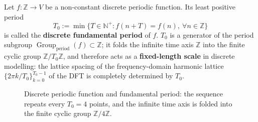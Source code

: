 \begin{definition}\label{def:discrete_fundamental_period}
Let $f:\mathbb{Z}\to V$ be a non-constant discrete periodic function. Its least positive period
\[
T_0:=\min\{T\in\mathbb{N}^+:f(n+T)=f(n),\ \forall n\in\mathbb{Z}\}
\]
is called the \textbf{discrete fundamental period} of $f$. $T_0$ is a generator of the period subgroup $\operatorname{Group}_{\mathrm{period}}(f)\subset\mathbb{Z}$; it folds the infinite time axis $\mathbb{Z}$ into the finite cyclic group $\mathbb{Z}/T_0\mathbb{Z}$, and therefore acts as a \textbf{fixed-length scale} in discrete modelling: the lattice spacing of the frequency-domain harmonic lattice $\{2\pi k/T_0\}_{k=0}^{T_0-1}$ of the DFT is completely determined by $T_0$.
\end{definition}

\begin{figure}[htbp]
\centering
{}
\caption{Discrete periodic function and fundamental period: the sequence repeats every $T_0=4$ points, and the infinite time axis is folded into the finite cyclic group $\mathbb{Z}/4\mathbb{Z}$.}
\label{fig:discrete_periodic}
\end{figure}

